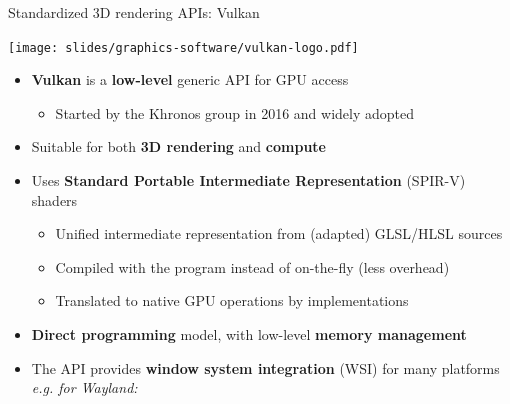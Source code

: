 \begin{frame}[t]{Standardized 3D rendering APIs: Vulkan}
  \begin{center}
  \texttt{[image: slides/graphics-software/vulkan-logo.pdf]}
  \end{center}

  \begin{itemize}
  \item \textbf{Vulkan} is a \textbf{low-level} generic API for GPU access
    \begin{itemize}
    \item Started by the Khronos group in 2016 and widely adopted
    \end{itemize}
  \item Suitable for both \textbf{3D rendering} and \textbf{compute}
  \item Uses \textbf{Standard Portable Intermediate Representation} (SPIR-V) shaders
    \begin{itemize}
    \item Unified intermediate representation from (adapted) GLSL/HLSL sources
    \item Compiled with the program instead of on-the-fly (less overhead)
    \item Translated to native GPU operations by implementations
    \end{itemize}
  \item \textbf{Direct programming} model, with low-level \textbf{memory management}
  \item The API provides \textbf{window system integration} (WSI) for many platforms\\
    \textit{e.g. for Wayland: }
  \end{itemize}
\end{frame}

